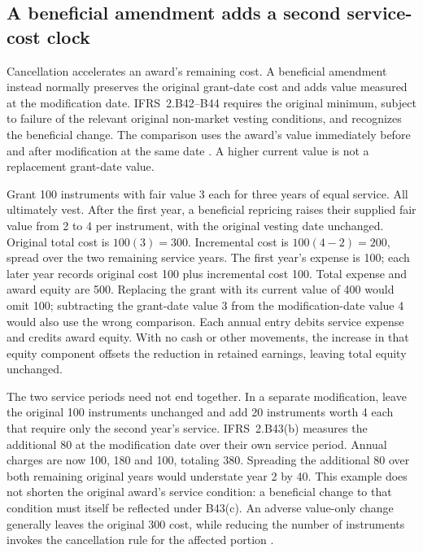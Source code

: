 \subsection{A beneficial amendment adds a second service-cost clock}
\label{sec:award-modifications}

Cancellation accelerates an award's remaining cost. A beneficial amendment
instead normally preserves the original grant-date cost and adds value measured
at the modification date. IFRS~2.B42--B44 requires the original minimum, subject
to failure of the relevant original non-market vesting conditions, and recognizes
the beneficial change. The comparison uses the award's value immediately before
and after modification at the same date
\citep[IFRS~2.27, B42--B44]{eu20231803}. A higher current value is not a
replacement grant-date value.

Grant 100 instruments with fair value 3 each for three years of equal service.
All ultimately vest. After the first year, a beneficial repricing raises their
supplied fair value from 2 to 4 per instrument, with the original vesting date
unchanged. Original total cost is $100(3)=300$. Incremental cost is
$100(4-2)=200$, spread over the two remaining service years. The first year's
expense is 100; each later year records original cost 100 plus incremental
cost 100. Total expense and award equity are 500. Replacing the grant with its
current value of 400 would omit 100; subtracting the grant-date value 3 from
the modification-date value 4 would also use the wrong comparison. Each annual
entry debits service expense and credits award equity. With no cash or other
movements, the increase in that equity component offsets the reduction in
retained earnings, leaving total equity unchanged.

The two service periods need not end together. In a separate modification,
leave the original 100 instruments unchanged and add 20 instruments worth 4
each that require only the second year's service. IFRS~2.B43(b) measures the
additional 80 at the modification date over their own service period. Annual
charges are now 100, 180 and 100, totaling 380. Spreading the additional 80
over both remaining original years would understate year 2 by 40. This example
does not shorten the original award's service condition: a beneficial change
to that condition must itself be reflected under B43(c). An adverse value-only
change generally leaves the original 300 cost, while reducing the number of
instruments invokes the cancellation rule for the affected portion
\citep[IFRS~2.B43(b)--(c), B44]{eu20231803}.

